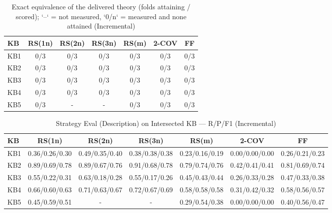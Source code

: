 \begin{table}[htbp]
\centering
\caption{Exact equivalence of the delivered theory (folds attaining / scored); `--` = not measured, `0/n` = measured and none attained (Incremental)}
\label{tab:exact_equiv_incremental}
\begin{tabular}{lcccccc}
\toprule
KB & RS(1n) & RS(2n) & RS(3n) & RS(m) & 2-COV & FF \\
\midrule
KB1 & 0/3 & 0/3 & 0/3 & 0/3 & 0/3 & 0/3 \\
KB2 & 0/3 & 0/3 & 0/3 & 0/3 & 0/3 & 0/3 \\
KB3 & 0/3 & 0/3 & 0/3 & 0/3 & 0/3 & 0/3 \\
KB4 & 0/3 & 0/3 & 0/3 & 0/3 & 0/3 & 0/3 \\
KB5 & 0/3 & - & - & 0/3 & 0/3 & 0/3 \\
\bottomrule
\end{tabular}
\end{table}

\begin{table}[htbp]
\centering
\caption{Strategy Eval (Description) on Intersected KB — R/P/F1 (Incremental)}
\label{tab:eval_description_incremental}
\begin{tabular}{lcccccc}
\toprule
KB & RS(1n) & RS(2n) & RS(3n) & RS(m) & 2-COV & FF \\
\midrule
KB1 & 0.36/0.26/0.30 & 0.49/0.35/0.40 & 0.38/0.38/0.38 & 0.23/0.16/0.19 & 0.00/0.00/0.00 & 0.26/0.21/0.23 \\
KB2 & 0.89/0.69/0.78 & 0.89/0.67/0.76 & 0.91/0.68/0.78 & 0.79/0.74/0.76 & 0.42/0.41/0.41 & 0.81/0.69/0.74 \\
KB3 & 0.55/0.22/0.31 & 0.63/0.18/0.28 & 0.55/0.17/0.26 & 0.45/0.43/0.44 & 0.26/0.33/0.28 & 0.47/0.33/0.38 \\
KB4 & 0.66/0.60/0.63 & 0.71/0.63/0.67 & 0.72/0.67/0.69 & 0.58/0.58/0.58 & 0.31/0.42/0.32 & 0.58/0.56/0.57 \\
KB5 & 0.45/0.59/0.51 & - & - & 0.29/0.54/0.38 & 0.00/0.00/0.00 & 0.40/0.56/0.47 \\
\bottomrule
\end{tabular}
\end{table}

